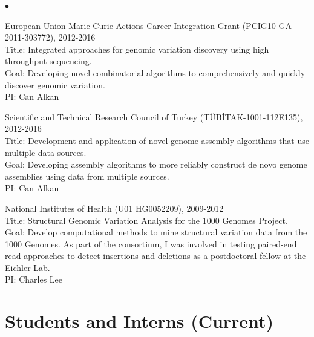 \documentclass[margin,line]{res}
\newenvironment{list2}{
  \begin{list}{$\bullet$}{%
      \setlength{\itemsep}{0.1cm}
      \setlength{\parsep}{0in} \setlength{\parskip}{0in}
      \setlength{\topsep}{0in} \setlength{\partopsep}{0in} 
      \setlength{\leftmargin}{0.2in}}}{\end{list}}
\begin{document}
\begin{resume}
\begin{list2}
                                       \item
                                         European Union Marie Curie Actions Career Integration Grant (PCIG10-GA-2011-303772),  2012-2016\\
                                         Title: Integrated approaches for genomic variation discovery using high throughput sequencing.\\
                                         Goal: Developing novel combinatorial algorithms to comprehensively and quickly discover genomic variation.\\
                                         PI: Can Alkan

                                       \item
                                         Scientific and Technical Research Council of Turkey (T\"{U}B\.{I}TAK-1001-112E135), 2012-2016\\
                                         Title: Development and application of novel genome assembly algorithms that use multiple data sources.\\
                                         Goal: Developing assembly algorithms to more reliably construct de novo genome assemblies using data from multiple sources.\\
                                         PI: Can Alkan
                                       \item
                                         National Institutes of Health (U01 HG0052209), 2009-2012\\
                                         Title: Structural Genomic Variation Analysis for the 1000 Genomes Project.\\
                                         Goal: Develop computational methods to mine structural variation data from the 1000 Genomes.
                                         As part of the consortium, I was involved in testing paired-end read approaches to detect insertions and deletions as a postdoctoral fellow at the Eichler Lab.\\
                                         PI: Charles Lee
                                       \end{list2}


\section{\sc Students and Interns (Current)}
\vspace*{-.4cm}

\end{resume}
\end{document}
